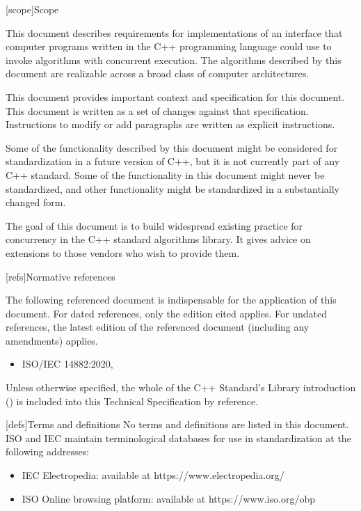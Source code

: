
[scope]{Scope}

\pnum
This document describes requirements for implementations of an interface that computer programs written in the C++ programming language could use to invoke algorithms with concurrent execution. The algorithms described by this document are realizable across a broad class of computer architectures.

\pnum
This document provides important context and specification for
this document. This document is written as a set of changes against that specification.  Instructions to modify or add paragraphs are written as
explicit instructions.

\pnum
Some of the functionality described by this document might be considered for standardization in a future version of C++, but it is not currently part of any C++ standard. Some of the functionality in this document might never be standardized, and other functionality might be standardized in a substantially changed form.

\pnum
The goal of this document is to build widespread existing practice for concurrency in the C++ standard algorithms library. It gives advice on extensions to those vendors who wish to provide them.

[refs]{Normative references}

\pnum
The following referenced document is indispensable for the application of this document. For dated references, only the edition cited applies. For undated references, the latest edition of the referenced document (including any amendments) applies.

\begin{itemize}
\item ISO/IEC 14882:2020, 
\end{itemize}

\pnum
Unless otherwise specified, the whole of the C++ Standard's Library introduction () is included into this Technical Specification by reference.


[defs]{Terms and definitions}
\pnum
{}%
No terms and definitions are listed in this document. ISO and IEC maintain
terminological databases for use in standardization at the following addresses:

\begin{itemize}
    \item IEC Electropedia: available at https://www.electropedia.org/
    \item ISO Online browsing platform: available at https://www.iso.org/obp
\end{itemize}

